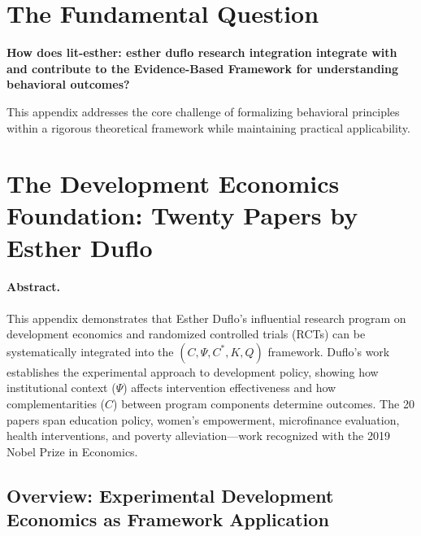 \section{The Fundamental Question}
\label{sec:duf-fundamental}

\begin{tcolorbox}[
    colback=red!5!white,
    colframe=red!75!black,
    title={\textbf{Fundamental Question}}
]
\textbf{How does lit-esther: esther duflo research integration integrate with and contribute to the
Evidence-Based Framework for understanding behavioral outcomes?}

This appendix addresses the core challenge of formalizing behavioral principles
within a rigorous theoretical framework while maintaining practical applicability.
\end{tcolorbox}




\section{The Development Economics Foundation: Twenty Papers by Esther Duflo}
\label{app:duflo}

\paragraph{Abstract.}
This appendix demonstrates that Esther Duflo's influential research program on
development economics and randomized controlled trials (RCTs) can be systematically 
integrated into the $(C, \Psi, C^*, K, Q)$ framework. Duflo's work establishes
the experimental approach to development policy, showing how institutional context 
($\Psi$) affects intervention effectiveness and how complementarities ($C$) between
program components determine outcomes. The 20 papers span education policy,
women's empowerment, microfinance evaluation, health interventions, and poverty
alleviation---work recognized with the 2019 Nobel Prize in Economics.

\subsection{Overview: Experimental Development Economics as Framework Application}

